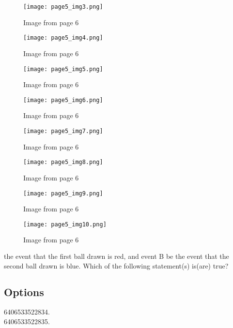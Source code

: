 \documentclass{article}
\begin{document}
\begin{figure}[h]
\centering
\texttt{[image: page5\_img3.png]}
\caption{Image from page 6}
\end{figure}

\begin{figure}[h]
\centering
\texttt{[image: page5\_img4.png]}
\caption{Image from page 6}
\end{figure}

\begin{figure}[h]
\centering
\texttt{[image: page5\_img5.png]}
\caption{Image from page 6}
\end{figure}

\begin{figure}[h]
\centering
\texttt{[image: page5\_img6.png]}
\caption{Image from page 6}
\end{figure}

\begin{figure}[h]
\centering
\texttt{[image: page5\_img7.png]}
\caption{Image from page 6}
\end{figure}

\begin{figure}[h]
\centering
\texttt{[image: page5\_img8.png]}
\caption{Image from page 6}
\end{figure}

\begin{figure}[h]
\centering
\texttt{[image: page5\_img9.png]}
\caption{Image from page 6}
\end{figure}

\begin{figure}[h]
\centering
\texttt{[image: page5\_img10.png]}
\caption{Image from page 6}
\end{figure}

the event that the first ball drawn is red, and event B be the event that the second ball drawn is 
blue. Which of the following statement(s) is(are) true?\\

\subsection{Options }

6406533522834.\\

6406533522835.\\
\end{document}
